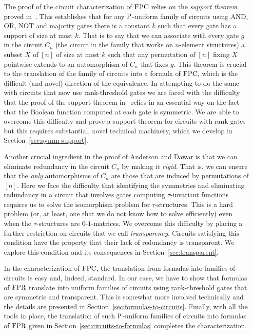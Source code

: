 \documentclass[../paper.tex]{subfiles}
\begin{document}
The proof of the circuit characterization of $\text{\upshape FPC}$ relies on the
\emph{support theorem} proved in~\cite{AndersonD17}.  This establishes
that for any $\mathrm{P}$-uniform family of circuits using AND, OR, NOT and
majority gates there is a constant $k$ such that every gate has a
support of size at most $k$.  That is to say that we can associate
with every gate $g$ in the circuit $C_n$ (the circuit in the family
that works on $n$-element structures) a subset $X$ of $[n]$ of size at
most $k$ such that any permutation of $[n]$ fixing $X$ pointwise
extends to an automorphism of $C_n$ that fixes $g$.  This theorem is
crucial to the translation of the family of circuits into a formula of
$\text{\upshape FPC}$, which is the difficult (and novel) direction of the
equivalence.  In attempting to do the same with circuits that now use
rank-threshold gates we are faced with the difficulty that the proof
of the support theorem in~\cite{AndersonD17} relies in an essential
way on the fact that the Boolean function computed at each gate is
symmetric.  We are able to overcome this difficulty and prove a
support theorem for circuits with rank gates but this requires
substantial, novel technical machinery, which we develop in
Section~\ref{sec:symm-support}. 

Another crucial ingredient in the proof of Anderson and Dawar is that
we can eliminate redundancy in the circuit $C_n$ by making it
\emph{rigid}.  That is, we can ensure that the \emph{only}
automorphisms of $C_n$ are those that are induced by permutations of
$[n]$.  Here we face the difficulty that identifying the symmetries
and eliminating redundancy in a circuit that involves gates computing
$\tau$-invariant functions requires us to solve the isomorphism
problem for $\tau$-structures.  This is a hard problem (or, at least,
one that we do not know how to solve efficiently) even when the
$\tau$-structures are $0$-$1$-matrices.  We overcome this difficulty
by placing a further restriction on circuits that we call
\emph{transparency}.  Circuits satisfying this condition have the
property that their lack of redundancy is transparent.  We explore
this condition and its consequences in Section~\ref{sec:transparent}.

In the characterization of $\text{\upshape FPC}$, the translation from formulas into
families of circuits is easy and, indeed, standard.  In our case, we
have to show that formulas of $\text{\upshape FPR}$ translate into uniform families of
circuits using rank-threshold gates that are symmetric and
transparent.  This is somewhat more involved technically and the
details are presented in Section~\ref{sec:formulas-to-circuits}.
Finally, with all the tools in place, the translation of such
$\mathrm{P}$-uniform families of circuits into formulas of $\text{\upshape FPR}$ given in Section~\ref{sec:circuits-to-formulas} completes
the characterization.
\end{document}
